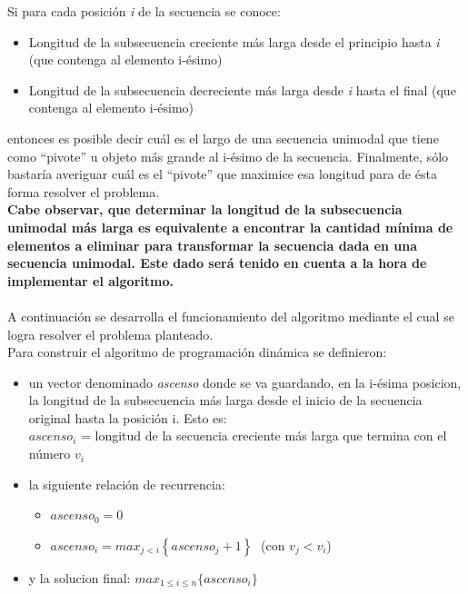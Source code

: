 Si para cada posición \textit{i} de la secuencia se conoce:
\begin{itemize}
	\item Longitud de la subsecuencia creciente más larga desde el principio hasta \textit{i} (que contenga al elemento i-ésimo)
	\item Longitud de la subsecuencia decreciente más larga desde \textit{i} hasta el final (que contenga al elemento i-ésimo)
\end{itemize}

entonces es posible decir cuál es el largo de una secuencia unimodal que tiene como ``pivote'' u objeto más grande al i-ésimo de la secuencia. Finalmente, sólo bastaría averiguar cuál es el ``pivote'' que maximice esa longitud para de ésta forma resolver el problema.\\
\textbf{Cabe observar, que determinar la longitud de la subsecuencia unimodal más larga es equivalente a encontrar la cantidad mínima de elementos a eliminar para transformar la secuencia dada en una secuencia unimodal. Este dado será tenido en cuenta a la hora de implementar el algoritmo.}

\paragraph{}
A continuación se desarrolla el funcionamiento del algoritmo mediante el cual se logra resolver el problema planteado.\\

Para construir el algoritmo de programación dinámica se definieron:
\begin{itemize}
	\item un vector denominado \textit{ascenso} donde se va guardando, en la i-ésima posicion, la longitud de la subsecuencia más larga desde el inicio de la secuencia original hasta la posición i. Esto es: \\ $ascenso_i$ = longitud de la secuencia creciente más larga que termina con el número $v_i$
	\item la siguiente relación de recurrencia:	 
	\begin{itemize} 
		\item $ascenso_0 = 0$
		\item $ascenso_i  = max_{j<i} \left\lbrace ascenso_j + 1\right\rbrace  \;      $ (con $ v_j < v_i  $)
	\end{itemize}
	\item y la solucion final: $max_{1\leq i\leq n} \{ascenso_i\}$
\end{itemize}

